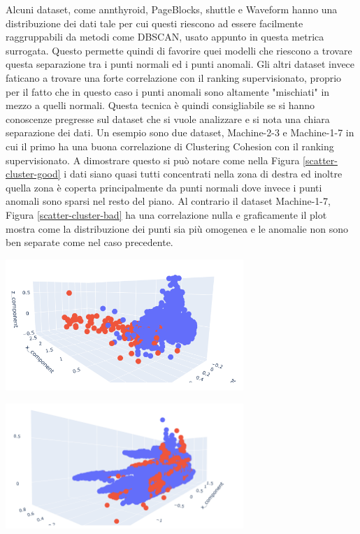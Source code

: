 Alcuni dataset, come annthyroid, PageBlocks, shuttle e Waveform hanno una distribuzione dei dati tale per cui questi riescono ad essere facilmente raggruppabili da metodi come DBSCAN, usato appunto in questa metrica surrogata. Questo permette quindi di favorire quei modelli che riescono a trovare questa separazione tra i punti normali ed i punti anomali.
Gli altri dataset invece faticano a trovare una forte correlazione con il ranking supervisionato, proprio per il fatto che in questo caso i punti anomali sono altamente "mischiati" in mezzo a quelli normali.
Questa tecnica è quindi consigliabile se si hanno conoscenze pregresse sul dataset che si vuole analizzare e si nota una chiara separazione dei dati. Un esempio sono due dataset, Machine-2-3 e Machine-1-7 in cui il primo ha una buona correlazione di Clustering Cohesion con il ranking supervisionato. A dimostrare questo si può notare come nella Figura \ref{scatter-cluster-good} i dati siano quasi tutti concentrati nella zona di destra ed inoltre quella zona è coperta principalmente da punti normali dove invece i punti anomali sono sparsi nel resto del piano. 
Al contrario il dataset Machine-1-7, Figura \ref{scatter-cluster-bad} ha una correlazione nulla e graficamente il plot mostra come la distribuzione dei punti sia più omogenea e le anomalie non sono ben separate come nel caso precedente. 
\begin{center}
	\includegraphics[width=9cm, scale=1]{images/scatter_cluster_good}
    \captionsetup{type=figure}
         \label{scatter-cluster-good}
\end{center}
\begin{center}
	\includegraphics[width=9cm, scale=1]{images/scatter_cluster}
    \captionsetup{type=figure}
      \label{scatter-cluster-bad}
\end{center}

